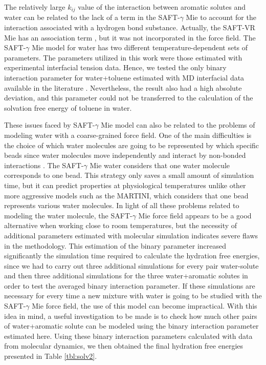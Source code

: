\documentclass[final,12p,times,twocolumn]{elsarticle}
\begin{document}
	The relatively large $k_{ij}$ value of the interaction between aromatic solutes and water can be related to the lack of a term in the SAFT-$\gamma$ Mie to account for the interaction associated with a hydrogen bond substance. Actually, the SAFT-VR Mie has an association term \cite{lafitte2013}, but it was not incorporated in the force field. The SAFT-$\gamma$ Mie model for water \cite{lobanova2016} has two different temperature-dependent sets of parameters. The parameters utilized in this work were those estimated with experimental interfacial tension data. Hence, we tested the only binary interaction parameter for water+toluene estimated with MD interfacial data available in the literature \cite{herdes2017}. Nevertheless, the result also had a high absolute deviation, and this parameter could not be transferred to the calculation of the solvation free energy of toluene in water. 
	
	These issues faced by SAFT-$\gamma$ Mie model can also be related to the problems of modeling water with a coarse-grained force field. One of the main difficulties is the choice of which water molecules are going to be represented by which specific beads since water molecules move independently and interact by non-bonded interactions \cite{hadley2010,hadley2012}. The  SAFT-$\gamma$ Mie water considers that one water molecule corresponds to one bead. This strategy only saves a small amount of simulation time, but it can predict properties at physiological temperatures unlike other more aggressive models such as the MARTINI, which considers that one bead represents various water molecules. In light of all these problems related to modeling the water molecule, the SAFT-$\gamma$ Mie force field appears to be a good alternative when working close to room temperatures, but the necessity of additional parameters estimated with molecular simulation indicates severe flaws in the methodology. This estimation of the binary parameter increased significantly the simulation time required to calculate the hydration free energies, since we had to carry out three additional simulations for every pair water-solute and then three additional simulations for the three water+aromatic solutes in order to test the averaged binary interaction parameter. If these simulations are necessary for every time a new mixture with water is going to be studied with the SAFT-$\gamma$ Mie force field, the use of this model can become impractical.  With this idea in mind, a useful investigation to be made is to check how much other pairs of water+aromatic solute can be modeled using the binary interaction parameter estimated here. Using these binary interaction parameters calculated with data from molecular dynamics, we then obtained the final hydration free energies presented in Table \ref{tbl:solv2}. 
	
\end{document}
